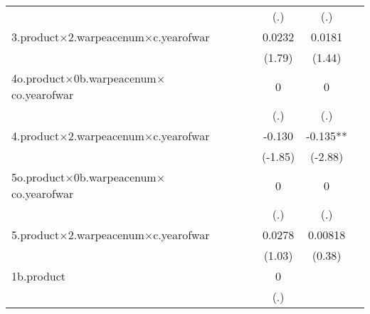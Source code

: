 {\begin{tabular}{l*{6}{c}}
                    &                     &                     &                     &         (.)         &         (.)         &                     \\
[1em]
3.product$\times$2.warpeacenum$\times$c.yearofwar&                     &                     &                     &      0.0232         &      0.0181         &                     \\
                    &                     &                     &                     &      (1.79)         &      (1.44)         &                     \\
[1em]
4o.product$\times$0b.warpeacenum$\times$co.yearofwar&                     &                     &                     &           0         &           0         &                     \\
                    &                     &                     &                     &         (.)         &         (.)         &                     \\
[1em]
4.product$\times$2.warpeacenum$\times$c.yearofwar&                     &                     &                     &      -0.130         &      -0.135** &                     \\
                    &                     &                     &                     &     (-1.85)         &     (-2.88)         &                     \\
[1em]
5o.product$\times$0b.warpeacenum$\times$co.yearofwar&                     &                     &                     &           0         &           0         &                     \\
                    &                     &                     &                     &         (.)         &         (.)         &                     \\
[1em]
5.product$\times$2.warpeacenum$\times$c.yearofwar&                     &                     &                     &      0.0278         &     0.00818         &                     \\
                    &                     &                     &                     &      (1.03)         &      (0.38)         &                     \\
[1em]
1b.product          &                     &                     &                     &           0         &                     &                     \\
                    &                     &                     &                     &         (.)         &                     &                     \\

\end{tabular}}
